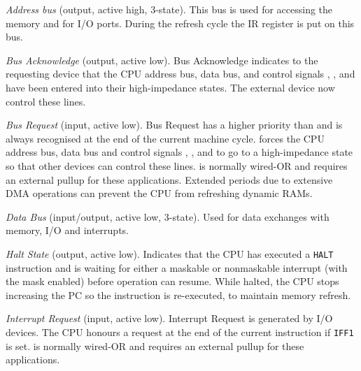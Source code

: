 \begin{description}[leftmargin=1.5em]

	\item[$A_{15}$-${A_0}$] 
	{\em Address bus} (output, active high, 3-state). This bus is used for accessing the memory and for I/O ports. During the refresh cycle the IR register is put on this bus.

	\item[\NoLinkChipPinLabel{BUSACK}]
	{\em Bus Acknowledge} (output, active low). Bus Acknowledge indicates to the requesting device that the CPU address bus, data bus, and control signals , ,  and  have been entered into their high-impedance states. The external device now control these lines.

	\item[\NoLinkChipPinLabel{BUSREQ}]
	{\em Bus Request} (input, active low). Bus Request has a higher priority than  and is always recognised at the end of the current machine cycle.  forces the CPU address bus, data bus and control signals , ,  and  to go to a high-impedance state so that other devices can control these lines.  is normally wired-OR and requires an external pullup for these applications. Extended  periods due to extensive DMA operations can prevent the CPU from refreshing dynamic RAMs.

	\item[${D_7}$-${D_0}$]
	{\em Data Bus} (input/output, active low, 3-state). Used for data exchanges with memory, I/O and interrupts.

	\item[\NoLinkChipPinLabel{HALT}]
	{\em Halt State} (output, active low). Indicates that the CPU has executed a {\tt HALT} instruction and is waiting for either a maskable or nonmaskable interrupt (with the mask enabled) before operation can resume. While halted, the CPU stops increasing the PC so the instruction is re-executed, to maintain memory refresh.

	\item[\NoLinkChipPinLabel{INT}]
	{\em Interrupt Request} (input, active low). Interrupt Request is generated by I/O devices. The CPU honours a request at the end of the current instruction if {\tt IFF1} is set.  is normally wired-OR and requires an external pullup for these applications.


\end{description}
